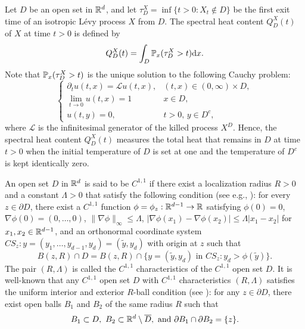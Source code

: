 \documentclass[11pt]{article}
\begin{document}
\begin{doublespace}
Let $D$ be an open set in $\R^{d}$, and let $\tau^X_{D}=\inf\{t>0:X_{t}\notin D\}$ be the first exit time of an isotropic L\'evy process $X$ from $D$. The spectral heat content $Q^X_{D}(t)$ of $X$ at time $t>0$ is defined by 
\[
Q^X_{D}(t)=\int_{D}\P_{x}(\tau_{D}^X>t)\ud x.
\]
Note that $\P_{x}(\tau^X_{D}>t)$ is the unique solution to the following Cauchy problem:
\[
\begin{cases}
\partial_{t}u(t,x)=\mathcal{L}u(t,x),  & (t,x)\in (0,\infty)\times D,\\
\lim_{t\to 0}u(t,x)=1 & x\in D,\\
u(t,y)=0, & t>0,\, y\in D^{c},
\end{cases}
\]
where $\mathcal{L}$ is the infinitesimal generator of the killed process $X^{D}$. Hence, the spectral heat content $Q^X_{D}(t)$ measures the total heat that remains in $D$ at time $t>0$ when the initial temperature of $D$ is set at one and the temperature of $D^{c}$ is kept identically zero. 


An open set $D$ in $\R^d$ is said to be $C^{1, 1}$ if 
there exist a localization radius $R>0$ and a constant $\Lambda>0$ that satisfy the following condition (see e.g., \cite{PS22}):
for every $z\in \partial D$, there exist a $C^{1, 1}$ function $\phi=\phi_z: \R^{d-1}\to \R$ satisfying $\phi(0)=0$, $\nabla \phi(0)=(0, \ldots, 0)$,
$\|\nabla\phi\|_\infty\le \Lambda$,
$|\nabla \phi(x_1)-\nabla \phi(x_2)|\le \Lambda |x_1-x_2|$ for $x_1,x_2\in \R^{d-1}$, and an orthonormal coordinate system $CS_z: y=(y_1,\ldots,y_{d-1},y_d)=(\tilde{y}, y_d)$
with origin at $z$ such that
\[
B(z, R)\cap D=B(z, R)\cap \{ y=(\tilde{y}, y_d) \mbox{ in } CS_z: y_d>\phi(\tilde{y})\}.
\]
The pair $(R, \Lambda)$ is called the $C^{1,1}$ characteristics of the $C^{1, 1}$ open set $D$. 
It is well-known that any $C^{1, 1}$ open set $D$ with $C^{1,1}$ characteristics $(R,\Lambda)$ satisfies the uniform interior and exterior $R$-ball condition 
(see \cite[Lemma 2.2]{AKSZ2007}): 
for any $z\in\partial D$,  there exist open balls $B_1$ and $B_2$ of the same radius $R$ such that 
\begin{align}\label{def:interior-exterior}
	B_1\subset D, \ B_2\subset\R^d\setminus\overline{D}, \ \textrm{and} \ \partial B_1\cap\partial B_2=\{z\}.
\end{align}


\end{doublespace}
\end{document}
